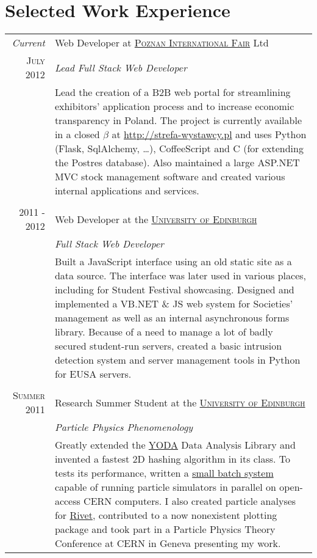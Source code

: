 \documentclass[a4paper,10pt]{article}
\begin{document}
\section{Selected Work Experience}
\begin{tabular}{r|p{11cm}}
    \emph{Current} & Web Developer at \textsc{\href{http://www.mtp.pl/en/}{Poznan International Fair}} Ltd \\\textsc{July 2012}&\emph{Lead Full Stack Web Developer}\\&\footnotesize{Lead the creation of a B2B web portal for streamlining exhibitors' application process and to increase economic transparency in Poland. The project is currently available in a closed \(\beta\) at \url{http://strefa-wystawcy.pl} and uses Python (Flask, SqlAlchemy, \ldots), CoffeeScript and C (for extending the Postres database). \newline Also maintained a large ASP.NET MVC stock management software and created various internal applications and services.}\\\multicolumn{2}{c}{} \\
    \textsc{2011 - 2012} & Web Developer at the \textsc{\href{https://www.eusa.ed.ac.uk/}{University of Edinburgh}} \\&\emph{Full Stack Web Developer}\\&\footnotesize{Built a JavaScript interface using an old static site as a data source. The interface was later used in various places, including for Student Festival showcasing. \newline Designed and implemented a VB.NET \& JS web system for Societies' management as well as an internal asynchronous forms library. Because of a need to manage a lot of badly secured student-run servers, created a basic intrusion detection system and server management tools in Python for EUSA servers.}\\\multicolumn{2}{c}{} \\
    \textsc{Summer 2011} & Research Summer Student at the \textsc{\href{http://www.ph.ed.ac.uk/}{University of Edinburgh}} \\&\emph{Particle Physics Phenomenology}\\&\footnotesize{Greatly extended the \href{https://yoda.hepforge.org/}{YODA} Data Analysis Library and invented a fastest 2D hashing algorithm in its class. To tests its performance, written a \href{https://github.com/mkawalec/Cern-summer}{small batch system} capable of running particle simulators in parallel on open-access CERN computers. I also created particle analyses for \href{http://rivet.hepforge.org/}{Rivet}, contributed to a now nonexistent plotting package and took part in a Particle Physics Theory Conference at CERN in Geneva presenting my work.}
\end{tabular}
\end{document}
